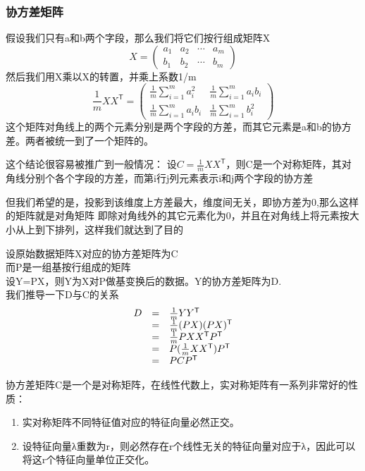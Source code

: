   \begin{frame}
  \frametitle{协方差矩阵}
  假设我们只有a和b两个字段，那么我们将它们按行组成矩阵X
  \[X=\begin{pmatrix}
  a_1 & a_2  &\cdots & a_m \\
  b_1 & b_2  &\cdots & b_m
\end{pmatrix}\]
然后我们用X乘以X的转置，并乘上系数1/m\\
\[\frac{1}{m}XX^\mathsf{T}=\begin{pmatrix}
  \frac{1}{m}\sum_{i=1}^m{a_i^2}   & \frac{1}{m}\sum_{i=1}^m{a_ib_i} \\
  \frac{1}{m}\sum_{i=1}^m{a_ib_i} & \frac{1}{m}\sum_{i=1}^m{b_i^2}
\end{pmatrix}\]
这个矩阵对角线上的两个元素分别是两个字段的方差，而其它元素是a和b的协方差。两者被统一到了一个矩阵的。

这个结论很容易被推广到一般情况：
设\(C=\frac{1}{m}XX^\mathsf{T}\)，则C是一个对称矩阵，其对角线分别个各个字段的方差，而第i行j列元素表示i和j两个字段的协方差
  \end{frame}
  
  \begin{frame}
  但我们希望的是，投影到该维度上方差最大，维度间无关，即协方差为0,那么这样的矩阵就是对角矩阵
  即除对角线外的其它元素化为0，并且在对角线上将元素按大小从上到下排列，这样我们就达到了目的
  \end{frame}
  
  \begin{frame}
  设原始数据矩阵X对应的协方差矩阵为C\\而P是一组基按行组成的矩阵\\
  设Y=PX，则Y为X对P做基变换后的数据。Y的协方差矩阵为D.\\我们推导一下D与C的关系
  \[\begin{array}{l l l}
  D &= &\frac{1}{m}YY^\mathsf{T} \\
    &= &\frac{1}{m}(PX)(PX)^\mathsf{T} \\
    & = & \frac{1}{m}PXX^\mathsf{T}P^\mathsf{T} \\
    &= &P(\frac{1}{m}XX^\mathsf{T})P^\mathsf{T} \\
    & = & PCP^\mathsf{T}
\end{array}\]
  \end{frame}
  
  
  \begin{frame}
  协方差矩阵C是一个是对称矩阵，在线性代数上，实对称矩阵有一系列非常好的性质：\\
   \begin{enumerate}
\item 实对称矩阵不同特征值对应的特征向量必然正交。
\item 设特征向量λ重数为r，则必然存在r个线性无关的特征向量对应于λ，因此可以将这r个特征向量单位正交化。
\end{enumerate}
  \end{frame}
  
